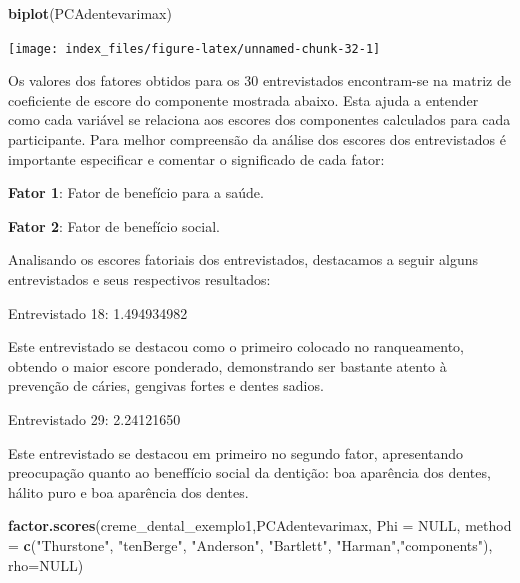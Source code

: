 \documentclass[12pt,brazil,oneside]{book}
\newenvironment{Shaded}{\begin{snugshade}}{\end{snugshade}}
\newcommand{\DataTypeTok}[1]{\textcolor[rgb]{0.13,0.29,0.53}{#1}}
\newcommand{\KeywordTok}[1]{\textcolor[rgb]{0.13,0.29,0.53}{\textbf{#1}}}
\newcommand{\NormalTok}[1]{#1}
\newcommand{\OtherTok}[1]{\textcolor[rgb]{0.56,0.35,0.01}{#1}}
\newcommand{\StringTok}[1]{\textcolor[rgb]{0.31,0.60,0.02}{#1}}
\begin{document}
\begin{Shaded}
\begin{Highlighting}[]
\KeywordTok{biplot}\NormalTok{(PCAdentevarimax)}
\end{Highlighting}
\end{Shaded}

\begin{center}\texttt{[image: index\_files/figure-latex/unnamed-chunk-32-1]} \end{center}

Os valores dos fatores obtidos para os 30 entrevistados encontram-se na matriz de coeficiente de escore do componente mostrada abaixo. Esta ajuda a entender como cada variável se relaciona aos escores dos componentes calculados para cada participante. Para melhor compreensão da análise dos escores dos entrevistados é importante especificar e comentar o significado de cada fator:

\textbf{Fator 1}: Fator de benefício para a saúde.

\textbf{Fator 2}: Fator de benefício social.

Analisando os escores fatoriais dos entrevistados, destacamos a seguir alguns entrevistados e seus respectivos resultados:

Entrevistado 18: 1.494934982

Este entrevistado se destacou como o primeiro colocado no ranqueamento, obtendo o maior escore ponderado, demonstrando ser bastante atento à prevenção de cáries, gengivas fortes e dentes sadios.

Entrevistado 29: 2.24121650

Este entrevistado se destacou em primeiro no segundo fator, apresentando preocupação quanto ao beneffício social da dentição: boa aparência dos dentes, hálito puro e boa aparência dos dentes.

\begin{Shaded}
\begin{Highlighting}[]
\KeywordTok{factor.scores}\NormalTok{(creme_dental_exemplo1,PCAdentevarimax, }
              \DataTypeTok{Phi =} \OtherTok{NULL}\NormalTok{, }
              \DataTypeTok{method =} \KeywordTok{c}\NormalTok{(}\StringTok{"Thurstone"}\NormalTok{, }\StringTok{"tenBerge"}\NormalTok{, }\StringTok{"Anderson"}\NormalTok{,}
                         \StringTok{"Bartlett"}\NormalTok{, }\StringTok{"Harman"}\NormalTok{,}\StringTok{"components"}\NormalTok{),}
              \DataTypeTok{rho=}\OtherTok{NULL}\NormalTok{)}
\end{Highlighting}
\end{Shaded}
\end{document}
